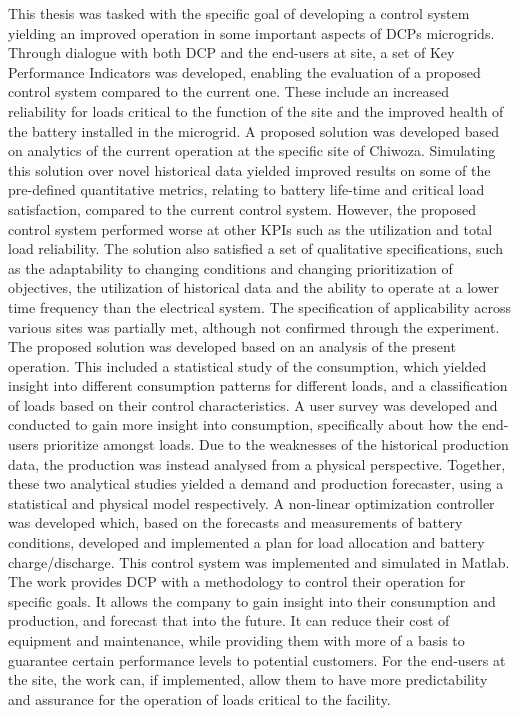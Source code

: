 This thesis was tasked with the specific goal of developing a control system yielding an improved operation in some important aspects of DCPs microgrids. Through dialogue with both DCP and the end-users at site, a set of Key Performance Indicators was developed, enabling the evaluation of a proposed control system compared to the current one. These include an increased reliability for loads critical to the function of the site and the improved health of the battery installed in the microgrid. A proposed solution was developed based on analytics of the current operation at the specific site of Chiwoza. Simulating this solution over novel historical data yielded improved results on some of the pre-defined quantitative metrics, relating to battery life-time and critical load satisfaction, compared to the current control system. However, the proposed control system performed worse at other KPIs such as the utilization and total load reliability. The solution also satisfied a set of qualitative specifications, such as the adaptability to changing conditions and changing prioritization of objectives, the utilization of historical data and the ability to operate at a lower time frequency than the electrical system. The specification of applicability across various sites was partially met, although not confirmed through the experiment.\\

The proposed solution was developed based on an analysis of the present operation. This included a statistical study of the consumption, which yielded insight into different consumption patterns for different loads, and a classification of loads based on their control characteristics. A user survey was developed and conducted to gain more insight into consumption, specifically about how the end-users prioritize amongst loads. Due to the weaknesses of the historical production data, the production was instead analysed from a physical perspective. Together, these two analytical studies yielded a demand and production forecaster, using a statistical and physical model respectively. A non-linear optimization controller was developed which, based on the forecasts and measurements of battery conditions, developed and implemented a plan for load allocation and battery charge/discharge. This control system was implemented and simulated in Matlab\cite{MATLAB}. \\

The work provides DCP with a methodology to control their operation for specific goals. It allows the company to gain insight into their consumption and production, and forecast that into the future. It can reduce their cost of equipment and maintenance, while providing them with more of a basis to guarantee certain performance levels to potential customers. For the end-users at the site, the work can, if implemented, allow them to have more predictability and assurance for the operation of loads critical to the facility.\\

